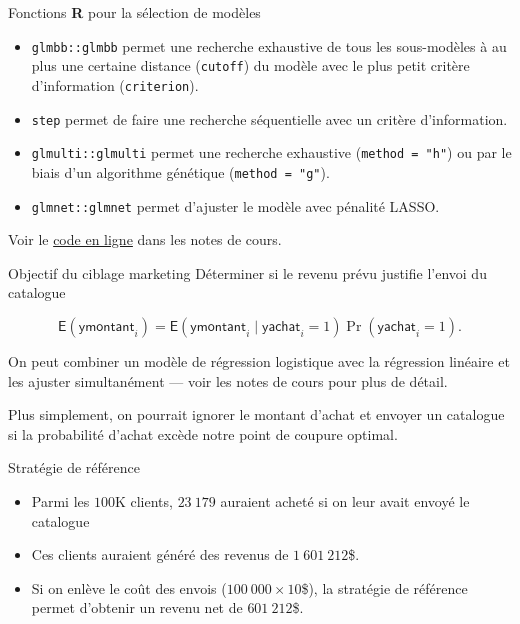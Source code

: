 \documentclass[
  ignorenonframetext,
]{beamer}
\providecommand{\tightlist}{%
  \setlength{\itemsep}{0pt}\setlength{\parskip}{0pt}}\usepackage{longtable,booktabs,array}
\begin{document}
\begin{frame}[fragile]{Fonctions \textbf{R} pour la sélection de
modèles}
\label{fonctions-r-pour-la-suxe9lection-de-moduxe8les}
\begin{itemize}
\tightlist
\item
  \texttt{glmbb::glmbb} permet une recherche exhaustive de tous les
  sous-modèles à au plus une certaine distance (\texttt{cutoff}) du
  modèle avec le plus petit critère d'information (\texttt{criterion}).
\item
  \texttt{step} permet de faire une recherche séquentielle avec un
  critère d'information.
\item
  \texttt{glmulti::glmulti} permet une recherche exhaustive
  (\texttt{method\ =\ "h"}) ou par le biais d'un algorithme génétique
  (\texttt{method\ =\ "g"}).
\item
  \texttt{glmnet::glmnet} permet d'ajuster le modèle avec pénalité
  LASSO.
\end{itemize}

Voir le
\href{https://lbelzile.github.io/math60602/05-reglogistique.html\#s\%C3\%A9lection-de-variables-en-r\%C3\%A9gression-logistique}{code
en ligne} dans les notes de cours.
\end{frame}

\begin{frame}{Objectif du ciblage marketing}
\label{objectif-du-ciblage-marketing}
Déterminer si le revenu prévu justifie l'envoi du catalogue

\[\mathsf{E}(\textsf{ymontant}_i) = \mathsf{E}(\textsf{ymontant}_i \mid \textsf{yachat}_i = 1)\Pr(\textsf{yachat}_i = 1).\]

On peut combiner un modèle de régression logistique avec la régression
linéaire et les ajuster simultanément --- voir les notes de cours pour
plus de détail.

Plus simplement, on pourrait ignorer le montant d'achat et envoyer un
catalogue si la probabilité d'achat excède notre point de coupure
optimal.
\end{frame}

\begin{frame}{Stratégie de référence}
\label{stratuxe9gie-de-ruxe9fuxe9rence}
\begin{itemize}
\tightlist
\item
  Parmi les \(100\)K clients, \(23~179\) auraient acheté si on leur
  avait envoyé le catalogue
\item
  Ces clients auraient généré des revenus de \(1~601~212\)\$.
\item
  Si on enlève le coût des envois (\(100~000 \times 10\)\$), la
  stratégie de référence permet d'obtenir un revenu net de
  \(601~212\)\$.
\end{itemize}
\end{frame}
\end{document}
